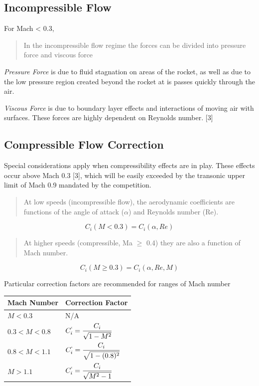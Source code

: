 \documentclass[]{article}
\begin{document}
\clearpage

\subsection{Incompressible Flow}\label{incompressible-flow}

For Mach \textless{} 0.3,

\begin{quote}
In the incompressible flow regime the forces can be divided into
pressure force and viscous force
\end{quote}

\emph{Pressure Force} is due to fluid stagnation on areas of the rocket,
as well as due to the low pressure region created beyond the rocket at
is passes quickly through the air.

\emph{Viscous Force} is due to boundary layer effects and interactions
of moving air with surfaces. These forces are highly dependent on
Reynolds number. {[}3{]}

\subsection{Compressible Flow
Correction}\label{compressible-flow-correction}

Special considerations apply when compressibility effects are in play.
These effects occur above Mach 0.3 {[}3{]}, which will be easily
exceeded by the transonic upper limit of Mach 0.9 mandated by the
competition.

\begin{quote}
At low speeds (incompressible flow), the aerodynamic coefficients are
functions of the angle of attack (\(\alpha\)) and Reynolds number (Re).
\end{quote}

\begin{equation}
C_i (M < 0.3) = C_i (\alpha, Re) 
\end{equation}

\begin{quote}
At higher speeds (compressible, Ma \(\ge\) 0.4) they are also a function
of Mach number.
\end{quote}

\begin{equation}
C_i (M \ge 0.3) = C_i (\alpha, Re, M)
\end{equation}

Particular correction factors are recommended for ranges of Mach number

\begin{longtable}[c]{@{}ll@{}}
\toprule
Mach Number & Correction Factor\tabularnewline
\midrule
\endhead
\( M < 0.3 \) & N/A\tabularnewline
\( 0.3 < M < 0.8 \) &
\( C^`_i = \dfrac{C_i}{\sqrt{1-M^2}} \)\tabularnewline
\( 0.8 < M < 1.1 \) &
\( C^`_i = \dfrac{C_i}{\sqrt{1-(0.8)^2}} \)\tabularnewline
\( M > 1.1 \) & \( C^`_i = \dfrac{C_i}{\sqrt{M^2-1}} \)\tabularnewline
\bottomrule
\end{longtable}
\end{document}
